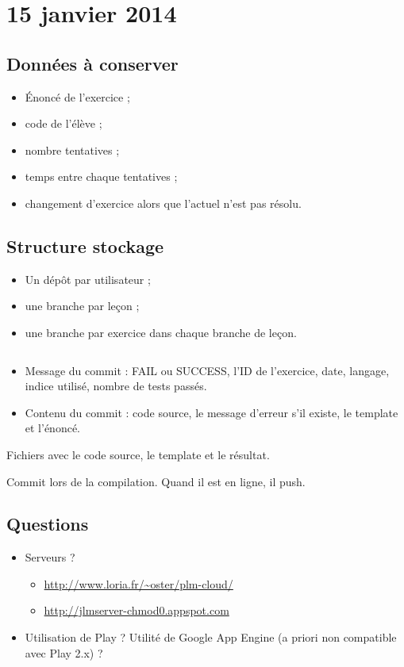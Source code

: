 \documentclass[12pt,a4paper]{article}
\author{HUGUENIN Cédric}
\begin{document}
\section{15 janvier 2014}
\subsection{Données à conserver}

\begin{itemize}
\item \'Enoncé de l'exercice ;
\item code de l'élève ;
\item nombre tentatives ;
\item temps entre chaque tentatives ;
\item changement d'exercice alors que l'actuel n'est pas résolu.
\end{itemize}

\subsection{Structure stockage}

\begin{itemize}
\item Un dépôt par utilisateur ;
\item une branche par leçon ;
\item une branche par exercice dans chaque branche de leçon.
\end{itemize}
$ $\\
\begin{itemize}
\item Message du commit : FAIL ou SUCCESS, l'ID de l'exercice, date, langage, indice utilisé, nombre de tests passés.
\item Contenu du commit : code source, le message d'erreur s'il existe, le template et l'énoncé.
\end{itemize}

Fichiers avec le code source, le template et le résultat.

Commit lors de la compilation.
Quand il est en ligne, il push.

\subsection{Questions}

\begin{itemize}
\item Serveurs ?
	\begin{itemize}
	\item \url{http://www.loria.fr/~oster/plm-cloud/}
	\item \url{http://jlmserver-chmod0.appspot.com}
	\end{itemize}
\item Utilisation de Play ? Utilité de Google App Engine (a priori non compatible avec Play 2.x) ?
\end{itemize}
\end{document}
